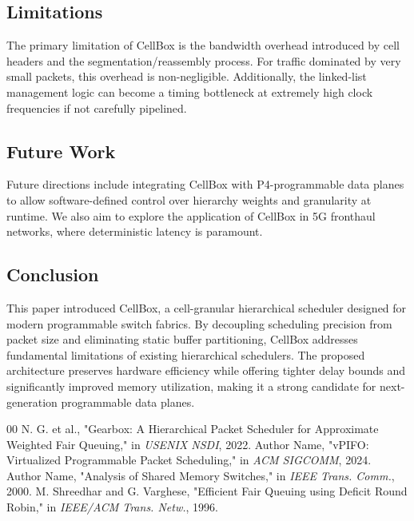 \documentclass[conference]{IEEEtran}
\begin{document}
\subsection{Limitations}
The primary limitation of CellBox is the bandwidth overhead introduced by cell headers and the segmentation/reassembly process. For traffic dominated by very small packets, this overhead is non-negligible. Additionally, the linked-list management logic can become a timing bottleneck at extremely high clock frequencies if not carefully pipelined.

\subsection{Future Work}
Future directions include integrating CellBox with P4-programmable data planes to allow software-defined control over hierarchy weights and granularity at runtime. We also aim to explore the application of CellBox in 5G fronthaul networks, where deterministic latency is paramount.

\subsection{Conclusion}
This paper introduced CellBox, a cell-granular hierarchical scheduler designed for modern programmable switch fabrics. By decoupling scheduling precision from packet size and eliminating static buffer partitioning, CellBox addresses fundamental limitations of existing hierarchical schedulers. The proposed architecture preserves hardware efficiency while offering tighter delay bounds and significantly improved memory utilization, making it a strong candidate for next-generation programmable data planes.

\begin{thebibliography}{00}
 N. G. et al., "Gearbox: A Hierarchical Packet Scheduler for Approximate Weighted Fair Queuing," in \textit{USENIX NSDI}, 2022.
 Author Name, "vPIFO: Virtualized Programmable Packet Scheduling," in \textit{ACM SIGCOMM}, 2024.
 Author Name, "Analysis of Shared Memory Switches," in \textit{IEEE Trans. Comm.}, 2000.
 M. Shreedhar and G. Varghese, "Efficient Fair Queuing using Deficit Round Robin," in \textit{IEEE/ACM Trans. Netw.}, 1996.
\end{thebibliography}
\end{document}
